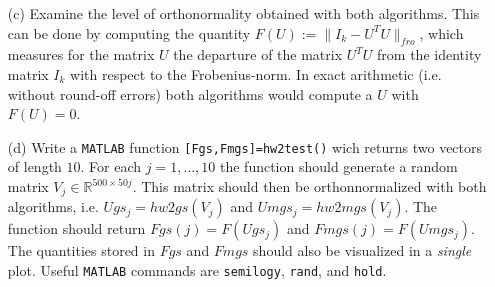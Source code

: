 \documentclass[10pt]{report}
\begin{document}
\begin{enumerate}
\begin{enumerate}
    \item[(c)] Examine the level of orthonormality obtained with both
    algorithms.
    This can be done by computing the quantity $F(U):=\|I_k-U^TU\|_{fro}$, which
    measures for the matrix $U$ the departure of the matrix $U^TU$ from the
    identity matrix $I_k$ with respect to the Frobenius-norm. In exact
    arithmetic (i.e. without round-off errors) both algorithms would compute
    a $U$ with $F(U)=0$.

    \item[(d)] Write a \verb+MATLAB+ function \verb+[Fgs,Fmgs]=hw2test()+ wich
    returns two vectors of length $10$. For each $j=1,\ldots,10$ the function
    should generate a random matrix $V_j\in\mathbb{R}^{500\times50j}$. This
    matrix should then be orthonnormalized with both algorithms, i.e.
    $Ugs_j=hw2gs(V_j)$ and $Umgs_j=hw2mgs(V_j)$. The function should return
    $Fgs(j)=F(Ugs_j)$ and $Fmgs(j)=F(Umgs_j)$. The quantities stored in $Fgs$
    and $Fmgs$ should also be visualized in a \textit{single} plot. Useful \verb+MATLAB+ commands are \verb+semilogy+, \verb+rand+, and \verb+hold+.
\end{enumerate}
\end{enumerate}
\end{document}
